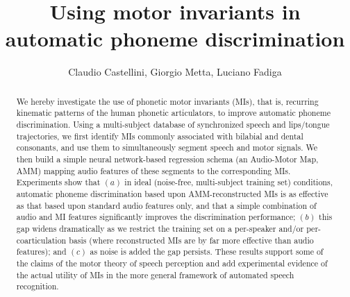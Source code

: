 \documentclass{pnastwo}
\begin{document}

\title{Using motor invariants in automatic phoneme discrimination}

\author{
Claudio Castellini,
Giorgio Metta,
Luciano Fadiga
}


\maketitle

\begin{article}

\begin{abstract}

  We hereby investigate the use of phonetic motor invariants (MIs),
  that is, recurring kinematic patterns of the human phonetic articulators,
  to improve automatic phoneme discrimination. Using a multi-subject
  database of synchronized speech and lips/tongue trajectories, we first
  identify MIs commonly associated with bilabial and dental consonants,
  and use them to simultaneously segment speech and motor signals.
  We then build a simple neural network-based regression schema (an Audio-Motor
  Map, AMM) mapping audio features of these segments to the corresponding
  MIs. Experiments show that $(a)$ in ideal (noise-free, multi-subject training set)
  conditions, automatic phoneme discrimination based upon AMM-reconstructed
  MIs is as effective as that based upon standard audio features
  only, and that a simple combination of audio and MI features significantly
  improves the discrimination performance; $(b)$ this gap widens dramatically
  as we restrict the training set on a per-speaker and/or per-coarticulation basis
  (where reconstructed MIs are by far more effective than
  audio features);  and $(c)$ as noise is added the gap persists. These results 
  support some of the claims of the motor theory of speech perception and add 
  experimental evidence of the actual utility of MIs in the more general framework of automated speech recognition.
  


\end{abstract}
\end{article}
\end{document}
